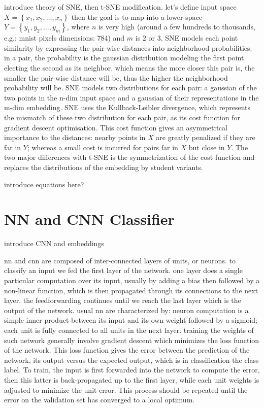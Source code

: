 \documentclass[a4paper,12pt]{report}
\newcommand{\eg}{e.g.}
\begin{document}
introduce theory of SNE, then t-SNE modification.
let's define input space $X = \left\{ x_1, x_2, \dots, x_n \right\}$ then the goal is to map into a lower-space $Y = \left\{ y_1, y_2, \dots, y_m \right\}$, where $n$ is very high (around a few hundreds to thousands, \eg: mnist pixels dimensions: 784) and $m$ is $2$ or $3$.
SNE models each point similarity by expressing the pair-wise distances into neighborhood probabilities.
in a pair, the probability is the gaussian distribution modeling the first point electing the second as its neighbor.
which means the more closer this pair is, the smaller the pair-wise distance will be, thus the higher the neighborhood probability will be.
SNE models two distributions for each pair: a gaussian of the two points in the n-dim input space and a gaussian of their representations in the m-dim embedding.
SNE uses the Kullback-Leibler divergence, which represents the mismatch of these two distribution for each pair, as its cost function for gradient descent optimisation.
This cost function gives an asymmetrical importance to the distances: nearby points in $X$ are greatly penalized if they are far in $Y$; whereas a small cost is incurred for pairs far in $X$ but close in $Y$.
The two major differences with t-SNE is the symmetrization of the cost function and replaces the distributions of the embedding by student variants.

introduce equations here?

\section{NN and CNN Classifier}
introduce CNN and embeddings

nn and cnn are composed of inter-connected layers of units, or neurons.
to classify an input we fed the first layer of the network.
one layer does a single particular computation over its input, usually by adding a bias then followed by a non-linear function, which is then propagated through its connections to the next layer.
the feedforwarding continues until we reach the last layer which is the output of the network.
usual nn are characterized by: neuron computation is a simple inner product between its input and its own weight followed by a sigmoid; each unit is fully connected to all units in the next layer.
training the weights of such network generally involve gradient descent which minimizes the loss function of the network.
This loss function gives the error between the prediction of the network, its output versus the expected output, which is in classification the class label.
To train, the input is first forwarded into the network to compute the error, then this latter is back-propagated up to the first layer, while each unit weights is adjusted to minimize the unit error.
This process should be repeated until the error on the validation set has converged to a local optimum.
\end{document}
